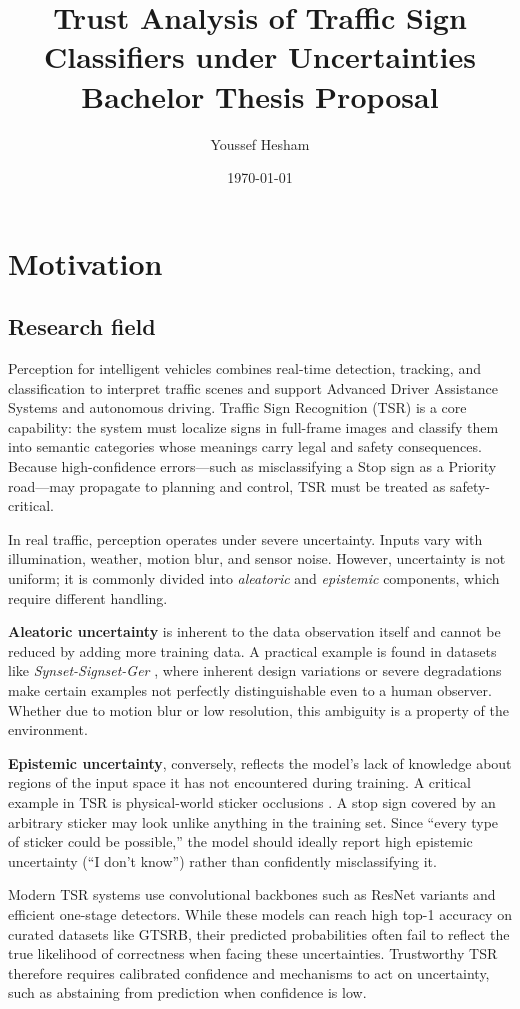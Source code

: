 \documentclass[11pt,a4paper]{article}
\title{Trust Analysis of Traffic Sign Classifiers under Uncertainties\\[2mm]
Bachelor Thesis Proposal}
\author{Youssef Hesham}
\date{\today}
\begin{document}
\maketitle

\section{Motivation}
\subsection{Research field}
Perception for intelligent vehicles combines real-time detection, tracking, and classification to interpret traffic scenes and support Advanced Driver Assistance Systems and autonomous driving. Traffic Sign Recognition (TSR) is a core capability: the system must localize signs in full-frame images and classify them into semantic categories whose meanings carry legal and safety consequences. Because high-confidence errors—such as misclassifying a Stop sign as a Priority road—may propagate to planning and control, TSR must be treated as safety-critical.

In real traffic, perception operates under severe uncertainty. Inputs vary with illumination, weather, motion blur, and sensor noise. However, uncertainty is not uniform; it is commonly divided into \textit{aleatoric} and \textit{epistemic} components, which require different handling.

\textbf{Aleatoric uncertainty} is inherent to the data observation itself and cannot be reduced by adding more training data. A practical example is found in datasets like \textit{Synset-Signset-Ger} \cite{synset2024}, where inherent design variations or severe degradations make certain examples not perfectly distinguishable even to a human observer. Whether due to motion blur or low resolution, this ambiguity is a property of the environment.

\textbf{Epistemic uncertainty}, conversely, reflects the model's lack of knowledge about regions of the input space it has not encountered during training. A critical example in TSR is physical-world sticker occlusions \cite{bayzidi2022stickers}. A stop sign covered by an arbitrary sticker may look unlike anything in the training set. Since ``every type of sticker could be possible,'' the model should ideally report high epistemic uncertainty (``I don't know'') rather than confidently misclassifying it.

Modern TSR systems use convolutional backbones such as ResNet variants and efficient one-stage detectors. While these models can reach high top-1 accuracy on curated datasets like GTSRB, their predicted probabilities often fail to reflect the true likelihood of correctness when facing these uncertainties. Trustworthy TSR therefore requires calibrated confidence and mechanisms to act on uncertainty, such as abstaining from prediction when confidence is low.
\end{document}
